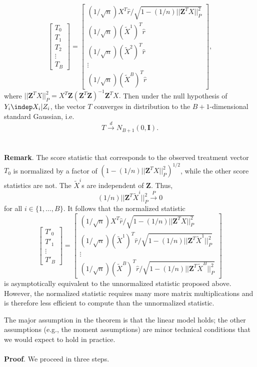 \documentclass[12pt]{article}
\newcommand{\bs}[1]{\boldsymbol{#1}}
\begin{document}
$$ \begin{bmatrix} T_0 \\ T_1 \\ T_2 \\ \vdots \\ T_B \end{bmatrix} = \begin{bmatrix} (1/\sqrt{n}) X^T  \hat{r} / \sqrt{1 - (1/n)||\bs{Z}^T X||^2_P} \\ (1/\sqrt{n}) (\tilde{X}^1)^T \hat{r} \\ (1/\sqrt{n}) (\tilde{X}^2)^T \hat{r} \\ \vdots \\ (1/\sqrt{n}) (\tilde{X}^B)^T \hat{r} \end{bmatrix},$$
where $||\bs{Z}^T X||_P^2 = X^T\bs{Z} (\bs{Z}^T \bs{Z})^{-1} \bs{Z}^TX.$ Then under the null hypothesis of $Y_i \indep X_i | Z_i$, the vector $T$ converges in distribution to the $B+1$-dimensional standard Gaussian, i.e. $$ T \xrightarrow{d} N_{B+1}(0, \bs{I}).$$
\\ \\ \noindent
\textbf{Remark}. The score statistic that corresponds to the observed treatment vector $T_0$ is normalized by a factor of $(1 - (1/n) || \bs{Z}^T X||^2_P)^{1/2}$, while the other score statistics are not. The $\tilde{X}^i$s are independent of $\bs{Z}$. Thus, $$ (1/n) ||\bs{Z}^T \tilde{X}^i||^2_P \xrightarrow{P} 0$$ for all $i \in \{1, \dots, B\}$. It follows that the normalized statistic
$$\begin{bmatrix} T'_0 \\ T'_1 \\ \vdots \\ T'_B \end{bmatrix} = \begin{bmatrix} (1/\sqrt{n}) X^T  \hat{r} / \sqrt{1 - (1/n)||\bs{Z}^T X||^2_P} \\ (1/\sqrt{n}) (\tilde{X}^1)^T  \hat{r} / \sqrt{1 - (1/n)||\bs{Z}^T \tilde{X}^1||^2_P} \\ \vdots \\ (1/\sqrt{n}) (\tilde{X}^B)^T  \hat{r} / \sqrt{1 - (1/n)||\bs{Z}^T \tilde{X}^B||^2_P} \end{bmatrix}$$ is asymptotically equivalent to the unnormalized statistic proposed above. However, the normalized statistic requires many more matrix multiplications and is therefore less efficient to compute than the unnormalized statistic.

The major assumption in the theorem is that the linear model holds; the other assumptions (e.g., the moment assumptions) are minor technical conditions that we would expect to hold in practice.
\\ \\ \noindent
\textbf{Proof}. 
We proceed in three steps.
\end{document}

